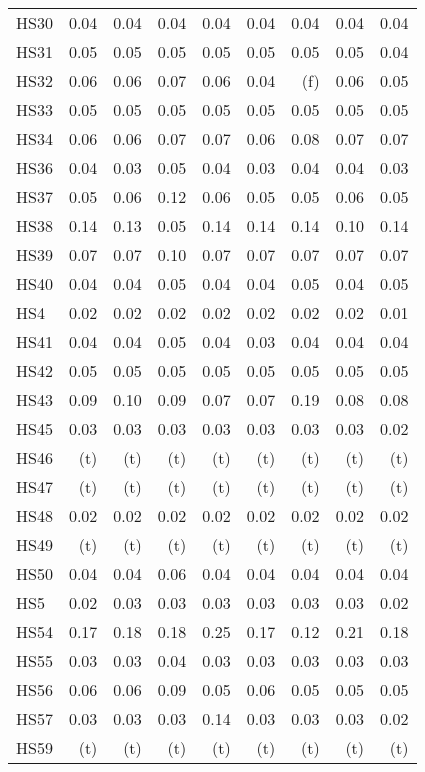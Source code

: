 \documentclass[11pt,twoside]{article}
\begin{document}
{\begin{longtable}[c]{|l|r|r|r|r|r|r|r|r|}
HS30 & 0.04 & 0.04 & 0.04 & 0.04 & 0.04 & 0.04 & 0.04 & 0.04 \\
HS31 & 0.05 & 0.05 & 0.05 & 0.05 & 0.05 & 0.05 & 0.05 & 0.04 \\
HS32 & 0.06 & 0.06 & 0.07 & 0.06 & 0.04 & (f) & 0.06 & 0.05 \\
HS33 & 0.05 & 0.05 & 0.05 & 0.05 & 0.05 & 0.05 & 0.05 & 0.05 \\
HS34 & 0.06 & 0.06 & 0.07 & 0.07 & 0.06 & 0.08 & 0.07 & 0.07 \\
HS36 & 0.04 & 0.03 & 0.05 & 0.04 & 0.03 & 0.04 & 0.04 & 0.03 \\
HS37 & 0.05 & 0.06 & 0.12 & 0.06 & 0.05 & 0.05 & 0.06 & 0.05 \\
HS38 & 0.14 & 0.13 & 0.05 & 0.14 & 0.14 & 0.14 & 0.10 & 0.14 \\
HS39 & 0.07 & 0.07 & 0.10 & 0.07 & 0.07 & 0.07 & 0.07 & 0.07 \\
HS40 & 0.04 & 0.04 & 0.05 & 0.04 & 0.04 & 0.05 & 0.04 & 0.05 \\
HS4 & 0.02 & 0.02 & 0.02 & 0.02 & 0.02 & 0.02 & 0.02 & 0.01 \\
HS41 & 0.04 & 0.04 & 0.05 & 0.04 & 0.03 & 0.04 & 0.04 & 0.04 \\
HS42 & 0.05 & 0.05 & 0.05 & 0.05 & 0.05 & 0.05 & 0.05 & 0.05 \\
HS43 & 0.09 & 0.10 & 0.09 & 0.07 & 0.07 & 0.19 & 0.08 & 0.08 \\
HS45 & 0.03 & 0.03 & 0.03 & 0.03 & 0.03 & 0.03 & 0.03 & 0.02 \\
HS46 & (t) & (t) & (t) & (t) & (t) & (t) & (t) & (t) \\
HS47 & (t) & (t) & (t) & (t) & (t) & (t) & (t) & (t) \\
HS48 & 0.02 & 0.02 & 0.02 & 0.02 & 0.02 & 0.02 & 0.02 & 0.02 \\
HS49 & (t) & (t) & (t) & (t) & (t) & (t) & (t) & (t) \\
HS50 & 0.04 & 0.04 & 0.06 & 0.04 & 0.04 & 0.04 & 0.04 & 0.04 \\
HS5 & 0.02 & 0.03 & 0.03 & 0.03 & 0.03 & 0.03 & 0.03 & 0.02 \\
HS54 & 0.17 & 0.18 & 0.18 & 0.25 & 0.17 & 0.12 & 0.21 & 0.18 \\
HS55 & 0.03 & 0.03 & 0.04 & 0.03 & 0.03 & 0.03 & 0.03 & 0.03 \\
HS56 & 0.06 & 0.06 & 0.09 & 0.05 & 0.06 & 0.05 & 0.05 & 0.05 \\
HS57 & 0.03 & 0.03 & 0.03 & 0.14 & 0.03 & 0.03 & 0.03 & 0.02 \\
HS59 & (t) & (t) & (t) & (t) & (t) & (t) & (t) & (t) \\

\end{longtable}}
\end{document}
